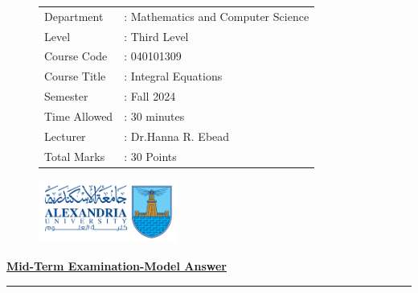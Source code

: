 \documentclass[]{article}
\begin{document}
\thispagestyle{empty}
\begin{figure}
    \begin{minipage}{0.7\textwidth}
        \begin{tabular}{l l}
            Department   & : Mathematics and Computer Science \\
            Level        & : Third Level                      \\
            Course Code  & : 040101309                        \\
            Course Title & :  Integral Equations              \\
            Semester     & : Fall 2024                        \\
            Time Allowed & : 30 minutes                       \\
            Lecturer     & : Dr.Hanna R. Ebead                \\
            Total Marks  & : 30 Points                        \\
        \end{tabular}
    \end{minipage}%
    \begin{minipage}{0.3\textwidth}
        \includegraphics[width=4.5cm]{collagelogo.png}
    \end{minipage}
\end{figure}
\vspace*{-1cm}
\begin{center}
    \textbf{\underline{\LARGE Mid-Term Examination-Model Answer}}
\end{center}
\vspace*{.2cm}

\hrule
\end{document}
